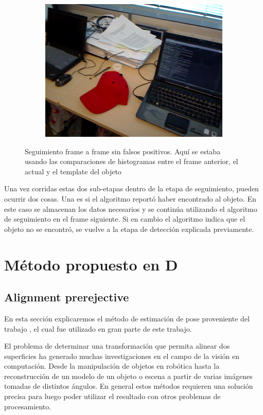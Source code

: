 \begin{figure}
\begin{subfigure}[b]{0.3\textwidth}
		\includegraphics[width=\textwidth]{img/seguimiento_frame_template/frame_template-desk_1-coffee_mug_5-frame_34.png}
	\end{subfigure}

	\caption{Seguimiento frame a frame sin falsos positivos. Aquí se estaba usando las comparaciones de histogramas entre el frame anterior, el actual y el template del objeto}
	\label{frame_template_tracking}
\end{figure}

Una vez corridas estas dos sub-etapas dentro de la etapa de seguimiento, pueden ocurrir dos cosas. Una es si el algoritmo reportó haber encontrado al objeto. En este caso se almacenan los datos necesarios y se continúa utilizando el algoritmo de seguimiento en el frame siguiente. Si en cambio el algoritmo indica que el objeto no se encontró, se vuelve a la etapa de detección explicada previamente.



\section{Método propuesto en D}
\subsection{Alignment prerejective}\label{alignment_prerejective}
En esta sección explicaremos el método de estimación de pose proveniente del trabajo \cite{6630856}, el cual fue utilizado en gran parte de este trabajo.

El problema de determinar una transformación que permita alinear dos superficies ha generado muchas investigaciones en el campo de la visión en computación. Desde la manipulación de objetos en robótica hasta la reconstrucción de un modelo de un objeto o escena a partir de varias imágenes tomadas de distintos ángulos. En general estos métodos requieren una solución precisa para luego poder utilizar el resultado con otros problemas de procesamiento.

